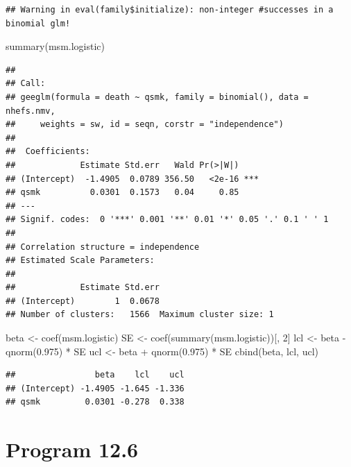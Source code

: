 \documentclass[
  10pt,
]{book}
\newenvironment{Shaded}{\begin{snugshade}}{\end{snugshade}}
\newcommand{\DecValTok}[1]{\textcolor[rgb]{0.00,0.00,0.81}{#1}}
\newcommand{\FloatTok}[1]{\textcolor[rgb]{0.00,0.00,0.81}{#1}}
\newcommand{\FunctionTok}[1]{\textcolor[rgb]{0.00,0.00,0.00}{#1}}
\newcommand{\NormalTok}[1]{#1}
\newcommand{\OtherTok}[1]{\textcolor[rgb]{0.56,0.35,0.01}{#1}}
\newcommand{\SpecialCharTok}[1]{\textcolor[rgb]{0.00,0.00,0.00}{#1}}
\begin{document}
\begin{verbatim}
## Warning in eval(family$initialize): non-integer #successes in a binomial glm!
\end{verbatim}

\begin{Shaded}
\begin{Highlighting}[]
\FunctionTok{summary}\NormalTok{(msm.logistic)}
\end{Highlighting}
\end{Shaded}

\begin{verbatim}
## 
## Call:
## geeglm(formula = death ~ qsmk, family = binomial(), data = nhefs.nmv, 
##     weights = sw, id = seqn, corstr = "independence")
## 
##  Coefficients:
##             Estimate Std.err   Wald Pr(>|W|)    
## (Intercept)  -1.4905  0.0789 356.50   <2e-16 ***
## qsmk          0.0301  0.1573   0.04     0.85    
## ---
## Signif. codes:  0 '***' 0.001 '**' 0.01 '*' 0.05 '.' 0.1 ' ' 1
## 
## Correlation structure = independence 
## Estimated Scale Parameters:
## 
##             Estimate Std.err
## (Intercept)        1  0.0678
## Number of clusters:   1566  Maximum cluster size: 1
\end{verbatim}

\begin{Shaded}
\begin{Highlighting}[]
\NormalTok{beta }\OtherTok{\textless{}{-}} \FunctionTok{coef}\NormalTok{(msm.logistic)}
\NormalTok{SE }\OtherTok{\textless{}{-}} \FunctionTok{coef}\NormalTok{(}\FunctionTok{summary}\NormalTok{(msm.logistic))[, }\DecValTok{2}\NormalTok{]}
\NormalTok{lcl }\OtherTok{\textless{}{-}}\NormalTok{ beta }\SpecialCharTok{{-}} \FunctionTok{qnorm}\NormalTok{(}\FloatTok{0.975}\NormalTok{) }\SpecialCharTok{*}\NormalTok{ SE}
\NormalTok{ucl }\OtherTok{\textless{}{-}}\NormalTok{ beta }\SpecialCharTok{+} \FunctionTok{qnorm}\NormalTok{(}\FloatTok{0.975}\NormalTok{) }\SpecialCharTok{*}\NormalTok{ SE}
\FunctionTok{cbind}\NormalTok{(beta, lcl, ucl)}
\end{Highlighting}
\end{Shaded}

\begin{verbatim}
##                beta    lcl    ucl
## (Intercept) -1.4905 -1.645 -1.336
## qsmk         0.0301 -0.278  0.338
\end{verbatim}

\hypertarget{program-12.6}{%
\section{Program 12.6}\label{program-12.6}}
\end{document}
